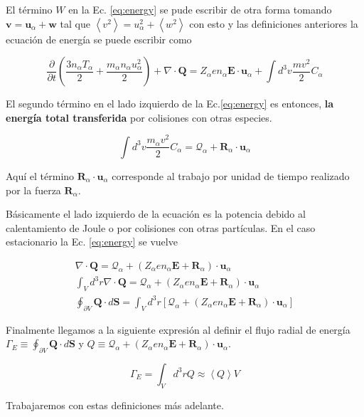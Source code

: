   El t\'ermino $W$ en la Ec. \eqref{eq:energy} se pude escribir de otra forma tomando$\textbf{v} = \textbf{u}_\alpha + \textbf{w}$ tal que $\left<v^2\right> = u^2_\alpha + \left<w^2\right>$ con esto y las definiciones anteriores la  ecuaci\'on de energ\'ia se puede escribir como \cite{helander2005} 

  \begin{equation}\label{eq:energy2}
    \frac{\partial}{\partial t}\left(\frac{3n_\alpha T_\alpha}{2} + \frac{m_\alpha n_\alpha u_\alpha^2}{2}\right) + \nabla\cdot\textbf{Q} = Z_\alpha e n_\alpha \textbf{E}\cdot\textbf{u}_\alpha + \int d^3v\frac{mv^2}{2}C_\alpha
  \end{equation} 

  El segundo t\'ermino en el lado izquierdo de la Ec.\eqref{eq:energy} es entonces, \textbf{la energ\'ia total transferida} por colisiones con otras especies.

  \begin{equation}
     \int d^3v \frac{m_\alpha v^2}{2}C_\alpha = \mathcal{Q}_\alpha + \textbf{R}_\alpha\cdot\textbf{u}_\alpha
  \end{equation}

  Aqu\'i el t\'ermino $\textbf{R}_\alpha\cdot\textbf{u}_\alpha$ corresponde al trabajo por unidad de tiempo realizado por la fuerza $\textbf{R}_\alpha$.

  B\'asicamente el lado izquierdo de la ecuaci\'on es la potencia debido al calentamiento de Joule o por colisiones con otras part\'iculas. En el caso estacionario la Ec. \eqref{eq:energy} se vuelve

  \begin{eqnarray}
  \nabla\cdot\textbf{Q} = \mathcal{Q}_\alpha + (Z_\alpha e n_\alpha\textbf{E} + \textbf{R}_\alpha)\cdot\textbf{u}_\alpha \nonumber\\
    \int_V d^3r \nabla\cdot\textbf{Q} = \mathcal{Q}_\alpha + (Z_\alpha e n_\alpha\textbf{E} + \textbf{R}_\alpha)\cdot\textbf{u}_\alpha\nonumber\\
    \oint_{\partial V} \textbf{Q}\cdot d\textbf{S} = \int_V d^3r\left[\mathcal{Q}_\alpha + (Z_\alpha e n_\alpha\textbf{E} + \textbf{R}_\alpha)\cdot\textbf{u}_\alpha\right] \nonumber
    \end{eqnarray}

    Finalmente llegamos a la siguiente expresi\'on al definir el flujo radial de energ\'ia $\Gamma_E \equiv \oint_{\partial V} \textbf{Q}\cdot d\textbf{S}$ y $Q \equiv \mathcal{Q}_\alpha + (Z_\alpha e n_\alpha\textbf{E} + \textbf{R}_\alpha)\cdot\textbf{u}_\alpha$.

    \begin{equation}
      \Gamma_E = \int_Vd^3r Q \approx \left<Q\right>V
    \end{equation}

   Trabajaremos con estas definiciones m\'as adelante.

   

   

